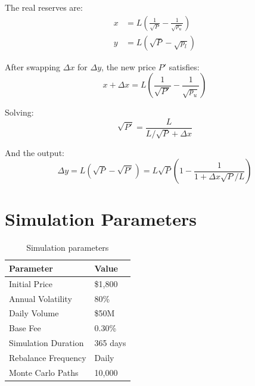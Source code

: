\documentclass[11pt,a4paper]{article}
\begin{document}
The real reserves are:
\begin{align}
    x &= L\left(\frac{1}{\sqrt{P}} - \frac{1}{\sqrt{p_u}}\right) \\
    y &= L\left(\sqrt{P} - \sqrt{p_l}\right)
\end{align}

After swapping $\Delta x$ for $\Delta y$, the new price $P'$ satisfies:
\begin{equation}
    x + \Delta x = L\left(\frac{1}{\sqrt{P'}} - \frac{1}{\sqrt{p_u}}\right)
\end{equation}

Solving:
\begin{equation}
    \sqrt{P'} = \frac{L}{L/\sqrt{P} + \Delta x}
\end{equation}

And the output:
\begin{equation}
    \Delta y = L(\sqrt{P} - \sqrt{P'}) = L\sqrt{P}\left(1 - \frac{1}{1 + \Delta x \sqrt{P}/L}\right)
\end{equation}

\section{Simulation Parameters}

\begin{table}[h]
\centering
\begin{tabular}{@{}ll@{}}
\toprule
Parameter & Value \\
\midrule
Initial Price & \$1,800 \\
Annual Volatility & 80\% \\
Daily Volume & \$50M \\
Base Fee & 0.30\% \\
Simulation Duration & 365 days \\
Rebalance Frequency & Daily \\
Monte Carlo Paths & 10,000 \\
\bottomrule
\end{tabular}
\caption{Simulation parameters}
\end{table}
\end{document}
